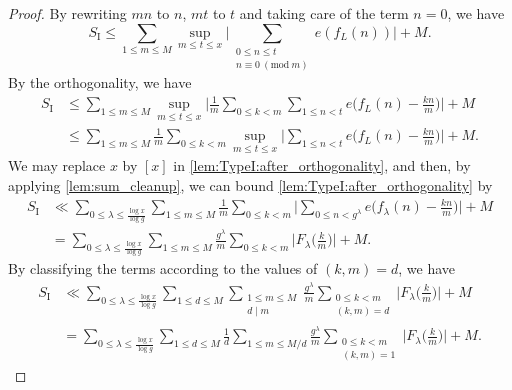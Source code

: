 \documentclass[hidelinks]{amsart}
\numberwithin{equation}{section}
\theoremstyle{plain}
\theoremstyle{definition}
\renewcommand{\mod}[1]{(\mathrm{mod}\ #1)}
\begin{document}
\begin{proof}
By rewriting $mn$ to $n$, $mt$ to $t$ and taking care of the term $n=0$, we have
\[
S_{\mathrm{I}}
\le
\sum_{1\le m\le M}
\sup_{m\le t\le x}
\biggl|
\sum_{\substack{
0\le n\le t\\
n\equiv 0\ \mod{m}
}}
e(f_{L}(n))
\biggr|
+
M.
\]
By the orthogonality, we have
\begin{align}
S_{\mathrm{I}}
&\le
\sum_{1\le m\le M}
\sup_{m\le t\le x}
\biggl|
\frac{1}{m}
\sum_{0\le k<m}
\sum_{1\le n<t}
e\biggl(f_{L}(n)-\frac{kn}{m}\biggr)
\biggr|
+
M\\
\label{lem:TypeI:after_orthogonality}
&\le
\sum_{1\le m\le M}
\frac{1}{m}
\sum_{0\le k<m}
\sup_{m\le t\le x}
\biggl|
\sum_{1\le n<t}
e\biggl(f_{L}(n)-\frac{kn}{m}\biggr)
\biggr|
+
M.
\end{align}
We may replace $x$ by $[x]$ in \cref{lem:TypeI:after_orthogonality},
and then, by applying \cref{lem:sum_cleanup}, we can bound \cref{lem:TypeI:after_orthogonality} by
\begin{align}
S_{\mathrm{I}}
&\ll
\sum_{0\le\lambda\le\frac{\log x}{\log g}}
\sum_{1\le m\le M}
\frac{1}{m}
\sum_{0\le k<m}
\biggl|
\sum_{0\le n<g^{\lambda}}
e\biggl(f_{\lambda}(n)-\frac{kn}{m}\biggr)
\biggr|
+
M\\
&=
\sum_{0\le\lambda\le\frac{\log x}{\log g}}
\sum_{1\le m\le M}
\frac{g^{\lambda}}{m}
\sum_{0\le k<m}
\biggl|F_{\lambda}\biggl(\frac{k}{m}\biggr)\biggr|
+
M.
\end{align}
By classifying the terms according to the values of $(k,m)=d$, we have
\begin{equation}
\label{lem:TypeI:before_hybrid_bound}
\begin{aligned}
S_{\mathrm{I}}
&\ll
\sum_{0\le\lambda\le\frac{\log x}{\log g}}
\sum_{1\le d\le M}
\sum_{\substack{
1\le m\le M\\
d\mid m
}}
\frac{g^{\lambda}}{m}
\sum_{\substack{
0\le k<m\\
(k,m)=d
}}
\biggl|F_{\lambda}\biggl(\frac{k}{m}\biggr)\biggr|
+
M\\
&=
\sum_{0\le\lambda\le\frac{\log x}{\log g}}
\sum_{1\le d\le M}
\frac{1}{d}
\sum_{1\le m\le M/d}
\frac{g^{\lambda}}{m}
\sum_{\substack{
0\le k<m\\
(k,m)=1
}}
\biggl|F_{\lambda}\biggl(\frac{k}{m}\biggr)\biggr|
+
M.
\end{aligned}
\end{equation}


\end{proof}
\end{document}
